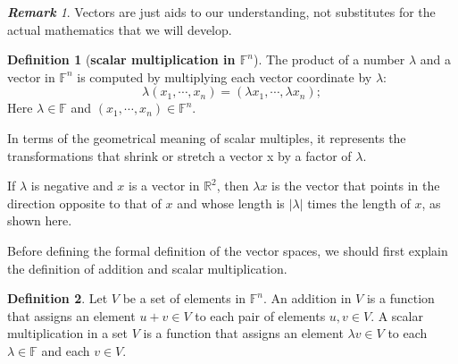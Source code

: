 \documentclass[paper=a4, fontsize=11pt]{scrartcl}
\numberwithin{equation}{section}		%
\numberwithin{figure}{section}			%
\numberwithin{table}{section}				%
\theoremstyle{definition}
\newtheorem{definition}{Definition}[section]
\theoremstyle{remark}
\newtheorem*{remark}{\textbf{Remark}}
\theoremstyle{example}
\begin{document}
\begin{remark}
    Vectors are just aids to our understanding, not substitutes for the actual mathematics that we will develop.
\end{remark}

\begin{definition}[\textbf{scalar multiplication in $\mathbb{F}^n$}]
    The product of a number $\lambda$ and a vector in $\mathbb{F}^n$ is computed by multiplying each vector coordinate by $\lambda$:
    \begin{equation}
        \lambda(x_1, \cdots, x_n) = (\lambda x_1, \cdots, \lambda x_n);
    \end{equation}
    Here $\lambda \in \mathbb{F}$ and $(x_1,\cdots,x_n) \in \mathbb{F}^n$.
\end{definition}

In terms of the geometrical meaning of scalar multiples, it represents the transformations that shrink or stretch a vector x by a factor of $\lambda$.

If $\lambda$ is negative and $x$ is a vector in $\mathbb{R}^2$, then $\lambda x$ is the vector that points in the direction opposite to that of $x$ and whose length is $\lvert \lambda \rvert$ times the length of $x$, as shown here.

Before defining the formal definition of the vector spaces, we should first explain the definition of addition and scalar multiplication.

\begin{definition}
    Let $V$ be a set of elements in $\mathbb{F}^n$. An addition in $V$ is a function that assigns an element $u+v\in V$ to each pair of elements $u,v \in V$. A scalar multiplication in a set $V$ is a function that assigns an element $\lambda v \in V$ to each $\lambda \in \mathbb{F}$ and each $v \in V$.
\end{definition}
\end{document}

